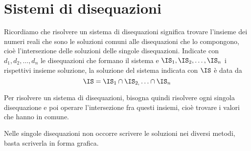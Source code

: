 \section{Sistemi di disequazioni}
\label{sec:diseq_sistemi}

Ricordiamo che risolvere un sistema di disequazioni significa trovare 
l'insieme dei numeri reali che sono le soluzioni comuni alle disequazioni che 
lo compongono, cioè l'intersezione delle soluzioni delle singole 
disequazioni. 
Indicate con \(d_{1}, d_{2}, \ldots, d_n\) le disequazioni che formano 
il sistema e \(\IS_{1}, \IS_{2}, \ldots,\IS_n\) i rispettivi insieme 
soluzione, la soluzione del sistema indicata con \(\IS\) è data da 
\[\IS=\IS_1 \cap \IS_{2,} \ldots \cap \IS_n\]

Per risolvere un sistema di disequazioni, bisogna quindi risolvere ogni 
singola disequazione e poi operare l'intersezione fra questi insiemi, cioè 
trovare i valori che hanno in comune.

\begin{osservazione}
 Nelle singole disequazioni non occorre scrivere le soluzioni nei diversi 
metodi, basta scriverla in forma grafica.
\end{osservazione}


